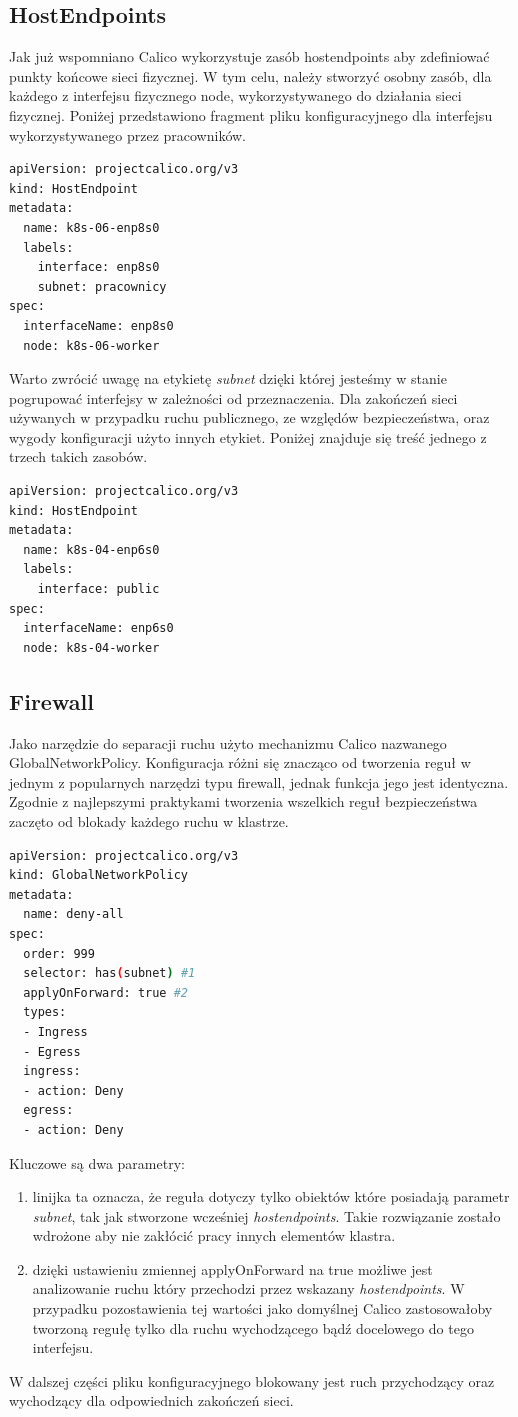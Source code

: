 \documentclass[pl,final,oneside]{mgr} %
\begin{document}
\subsection{HostEndpoints}
Jak już wspomniano Calico wykorzystuje zasób hostendpoints aby zdefiniować punkty końcowe sieci fizycznej. W tym celu, należy stworzyć osobny zasób, dla każdego z interfejsu fizycznego node, wykorzystywanego do działania sieci fizycznej. Poniżej przedstawiono fragment pliku konfiguracyjnego dla interfejsu wykorzystywanego przez pracowników.

\begin{lstlisting}[language=Bash]
apiVersion: projectcalico.org/v3
kind: HostEndpoint
metadata:
  name: k8s-06-enp8s0
  labels: 
    interface: enp8s0
    subnet: pracownicy
spec:
  interfaceName: enp8s0
  node: k8s-06-worker
\end{lstlisting}
Warto zwrócić uwagę na etykietę \textit{subnet} dzięki której jesteśmy w stanie pogrupować interfejsy w zależności od przeznaczenia. Dla zakończeń sieci używanych w przypadku ruchu publicznego, ze względów bezpieczeństwa, oraz wygody konfiguracji użyto innych etykiet. Poniżej znajduje się treść jednego z trzech takich zasobów.
\begin{lstlisting}[language=Bash]
apiVersion: projectcalico.org/v3
kind: HostEndpoint
metadata:
  name: k8s-04-enp6s0
  labels: 
    interface: public
spec:
  interfaceName: enp6s0
  node: k8s-04-worker
\end{lstlisting}

\subsection{Firewall}
Jako narzędzie do separacji ruchu użyto mechanizmu Calico nazwanego GlobalNetworkPolicy. Konfiguracja różni się znacząco od tworzenia reguł w jednym z popularnych narzędzi typu firewall, jednak funkcja jego jest identyczna. Zgodnie z najlepszymi praktykami tworzenia wszelkich reguł bezpieczeństwa zaczęto od blokady każdego ruchu w klastrze.
\begin{lstlisting}[language=Bash]
apiVersion: projectcalico.org/v3
kind: GlobalNetworkPolicy
metadata:
  name: deny-all
spec:
  order: 999
  selector: has(subnet) #1
  applyOnForward: true #2
  types:
  - Ingress
  - Egress
  ingress:
  - action: Deny
  egress:
  - action: Deny
\end{lstlisting}
Kluczowe są dwa parametry:
\begin{enumerate}
	\item linijka ta oznacza, że reguła dotyczy tylko obiektów które posiadają parametr \textit{subnet}, tak jak stworzone wcześniej \textit{hostendpoints}. Takie rozwiązanie zostało wdrożone aby nie zakłócić pracy innych elementów klastra.
	\item dzięki ustawieniu zmiennej applyOnForward na true możliwe jest analizowanie ruchu który przechodzi przez wskazany \textit{hostendpoints}. W przypadku pozostawienia tej wartości jako domyślnej Calico zastosowałoby tworzoną regułę tylko dla ruchu wychodzącego bądź docelowego do tego interfejsu.
\end{enumerate}
W dalszej części pliku konfiguracyjnego blokowany jest ruch przychodzący oraz wychodzący dla odpowiednich zakończeń sieci.
\end{document}
